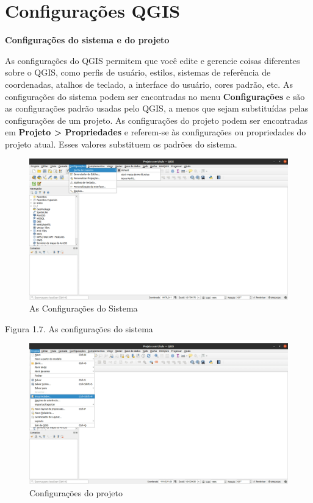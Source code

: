 \documentclass[
]{krantz}
\begin{document}
\hypertarget{configurauxe7uxf5es-qgis}{%
\section{Configurações QGIS}\label{configurauxe7uxf5es-qgis}}

\textbf{Configurações do sistema e do projeto}

As configurações do QGIS permitem que você edite e gerencie coisas diferentes sobre o QGIS, como perfis de usuário, estilos, sistemas de referência de coordenadas, atalhos de teclado, a interface do usuário, cores padrão, etc. As configurações do sistema podem ser encontradas no menu \textbf{Configurações} e são as configurações padrão usadas pelo QGIS, a menos que sejam substituídas pelas configurações de um projeto. As configurações do projeto podem ser encontradas em \textbf{Projeto \textgreater{} Propriedades} e referem-se às configurações ou propriedades do projeto atual. Esses valores substituem os padrões do sistema.

\begin{figure}
\centering
\includegraphics{media/modulo1/settings-1.png}
\caption{As Configurações do Sistema}
\end{figure}

Figura 1.7. As configurações do sistema

\begin{figure}
\centering
\includegraphics{media/modulo1/settings-2.png}
\caption{Configurações do projeto}
\end{figure}
\end{document}
